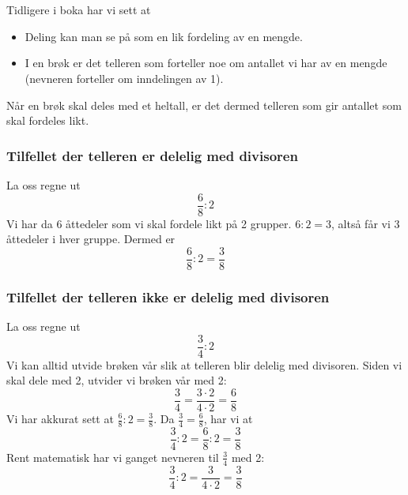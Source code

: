 \newpage
\section{\brdelheil} \label{brdelheil}
Tidligere i boka har vi sett at
\begin{itemize}
	\item Deling kan man se på som en lik fordeling av en mengde.
	\item I en brøk er det telleren som forteller noe om antallet vi har av en mengde (nevneren forteller om inndelingen av 1).
\end{itemize}
Når en brøk skal deles med et heltall, er det dermed telleren som gir antallet som skal fordeles likt.
\subsubsection{Tilfellet der telleren er delelig med divisoren}
La oss regne ut
\[ \frac{6}{8}:2 \]
Vi har da 6 åttedeler som vi skal fordele likt på 2 grupper. $ 6:2=3 $, altså får vi 3 åttedeler i hver gruppe. Dermed er
\[ \frac{6}{8}:2=\frac{3}{8} \]
\newpage
\subsubsection{Tilfellet der telleren ikke er delelig med divisoren}
La oss regne ut
\[ \frac{3}{4}:2 \]
Vi kan alltid utvide brøken vår slik at telleren blir delelig med divisoren. Siden vi skal dele med 2, utvider vi brøken vår med 2:
\[ \frac{3}{4}=\frac{3\cdot2}{4\cdot2}=\frac{6}{8} \]
Vi har akkurat sett at ${\frac{6}{8}:2=\frac{3}{8}}$. Da ${\frac{3}{4}=\frac{6}{8}}$, har vi at
\[ \frac{3}{4}:2=\frac{6}{8}:2=\frac{3}{8} \]
Rent matematisk har vi ganget nevneren til $ \frac{3}{4} $ med 2:
\[ \frac{3}{4}:2 = \frac{3}{4\cdot2} = \frac{3}{8} \]
\eks[1]{\vs
\[ \frac{5}{3}:6 = \frac{5}{3\cdot 6} 
= \frac{5}{18} \]
}
